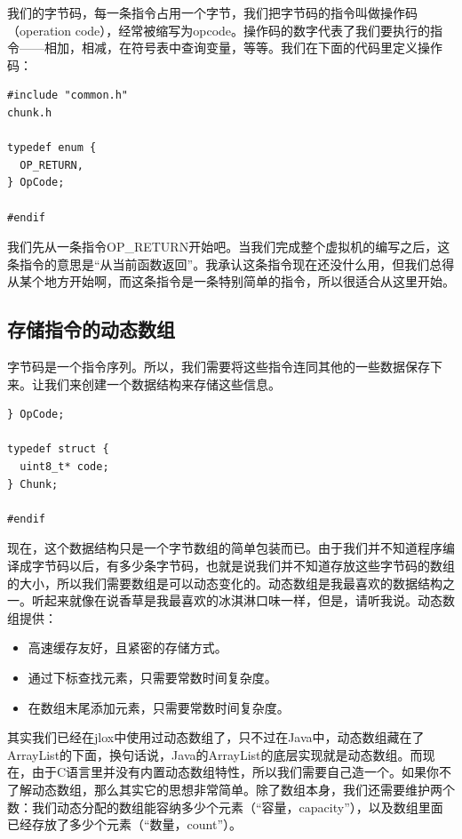 \documentclass[cn,10pt,math=newtx,citestyle=gb7714-2015,bibstyle=gb7714-2015]{elegantbook}
\newenvironment{code}{\captionsetup{type=listing}}{}
\begin{document}
我们的字节码，每一条指令占用一个字节，我们把字节码的指令叫做操作码（operation code），经常被缩写为opcode。操作码的数字代表了我们要执行的指令——相加，相减，在符号表中查询变量，等等。我们在下面的代码里定义操作码：

\begin{code}
\begin{verbatim}
#include "common.h"
chunk.h

typedef enum {
  OP_RETURN,
} OpCode;

#endif
\end{verbatim}
\end{code}

我们先从一条指令OP\_RETURN开始吧。当我们完成整个虚拟机的编写之后，这条指令的意思是“从当前函数返回”。我承认这条指令现在还没什么用，但我们总得从某个地方开始啊，而这条指令是一条特别简单的指令，所以很适合从这里开始。

\subsection{存储指令的动态数组}

字节码是一个指令序列。所以，我们需要将这些指令连同其他的一些数据保存下来。让我们来创建一个数据结构来存储这些信息。

\begin{code}
\begin{verbatim}
} OpCode;

typedef struct {
  uint8_t* code;
} Chunk;

#endif
\end{verbatim}
\end{code}

现在，这个数据结构只是一个字节数组的简单包装而已。由于我们并不知道程序编译成字节码以后，有多少条字节码，也就是说我们并不知道存放这些字节码的数组的大小，所以我们需要数组是可以动态变化的。动态数组是我最喜欢的数据结构之一。听起来就像在说香草是我最喜欢的冰淇淋口味一样，但是，请听我说。动态数组提供：

\begin{itemize}
   \item 高速缓存友好，且紧密的存储方式。
   \item 通过下标查找元素，只需要常数时间复杂度。
   \item 在数组末尾添加元素，只需要常数时间复杂度。
\end{itemize}

其实我们已经在jlox中使用过动态数组了，只不过在Java中，动态数组藏在了ArrayList的下面，换句话说，Java的ArrayList的底层实现就是动态数组。而现在，由于C语言里并没有内置动态数组特性，所以我们需要自己造一个。如果你不了解动态数组，那么其实它的思想非常简单。除了数组本身，我们还需要维护两个数：我们动态分配的数组能容纳多少个元素（“容量，capacity”），以及数组里面已经存放了多少个元素（“数量，count”）。
\end{document}
